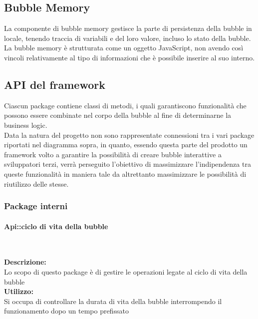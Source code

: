 \subsection{Bubble Memory}
La componente di bubble memory gestisce la parte di persistenza della bubble in locale, tenendo traccia di variabili e del loro valore, incluso lo stato della bubble. La bubble memory è strutturata come un oggetto JavaScript, non avendo così vincoli relativamente al tipo di informazioni che è possibile inserire al suo interno.

\subsection{API del framework}
Ciascun package contiene classi di metodi, i quali garantiscono funzionalità che possono essere combinate nel corpo della bubble al fine di determinarne la business logic.\\
Data la natura del progetto non sono rappresentate connessioni tra i vari package riportati nel diagramma sopra, in quanto, essendo questa parte del prodotto un framework volto a garantire la possibilità di creare bubble interattive a sviluppatori terzi, verrà perseguito l'obiettivo di massimizzare l'indipendenza tra queste funzionalità in maniera tale da altrettanto massimizzare le possibilità di riutilizzo delle stesse.

\subsubsection{Package interni}

\begin{samepage}
\paragraph{Api::ciclo di vita della bubble}\label{api-ciclovita}\mbox{}\\
\end{samepage}
\textbf{Descrizione:}\\ 
Lo scopo di questo package è di gestire le operazioni legate al ciclo di vita della bubble\\
\textbf{Utilizzo:}\\
Si occupa di controllare la durata di vita della bubble interrompendo il funzionamento dopo un tempo prefissato\\

